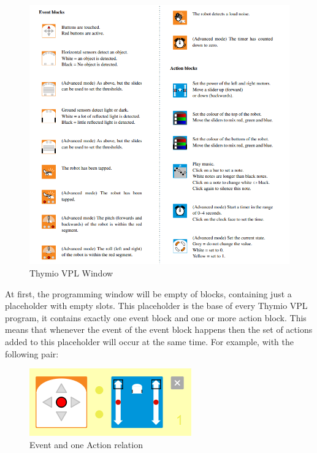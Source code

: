 \documentclass{scrartcl}
\begin{document}
\begin{figure}
  \includegraphics[width=\textwidth]{./VPL/Thymio_blocks}
  \caption{Thymio VPL Window}
  \label{fig:thymio_vpl_window}
\end{figure}

At first, the programming window will be empty of blocks, containing just a placeholder with empty slots. 
This placeholder is the base of every Thymio VPL program, it contains exactly one event block and one or more action block. 
This means that whenever the event of the event block happens then the set of actions added to this placeholder will occur at the same time. 
For example, with the following pair: \\
\begin{figure}
  \centering
  \includegraphics[scale=0.5]{./VPL/middlebtn_forward}
  \caption{Event and one Action relation}
  \label{fig:thymio_vpl_middlebtn_1e1a}
\end{figure}
\end{document}
